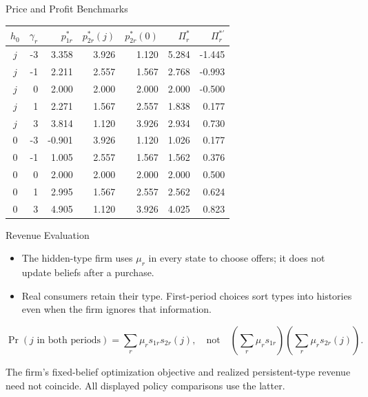 \gdef\shortbuttons{\hyperlink{short-14}{\beamergotobutton{Back}}}
\begin{frame}[label=short-13,noframenumbering]{Price and Profit Benchmarks}
  \begin{center}\small\begin{tabular}{crrrrrr}\toprule
  $h_0$ & $\gamma_r$ & $p_{1r}^*$ & $p_{2r}^*(j)$ & $p_{2r}^*(0)$ & $\Pi_r^*$ & $\Pi_r^{*\prime}$\\\midrule
  $j$ & -3 & 3.358 & 3.926 & 1.120 & 5.284 & -1.445\\
  $j$ & -1 & 2.211 & 2.557 & 1.567 & 2.768 & -0.993\\
  $j$ & 0 & 2.000 & 2.000 & 2.000 & 2.000 & -0.500\\
  $j$ & 1 & 2.271 & 1.567 & 2.557 & 1.838 & 0.177\\
  $j$ & 3 & 3.814 & 1.120 & 3.926 & 2.934 & 0.730\\
  $0$ & -3 & -0.901 & 3.926 & 1.120 & 1.026 & 0.177\\
  $0$ & -1 & 1.005 & 2.557 & 1.567 & 1.562 & 0.376\\
  $0$ & 0 & 2.000 & 2.000 & 2.000 & 2.000 & 0.500\\
  $0$ & 1 & 2.995 & 1.567 & 2.557 & 2.562 & 0.624\\
  $0$ & 3 & 4.905 & 1.120 & 3.926 & 4.025 & 0.823\\
  \bottomrule\end{tabular}\end{center}
\end{frame}



\gdef\shortbuttons{\hyperlink{short-20}{\beamergotobutton{Back}}}
\begin{frame}[label=short-54,noframenumbering]{Revenue Evaluation}
  \begin{itemize}
    \item The hidden-type firm uses $\mu_r$ in every state to choose offers;
    it does not update beliefs after a purchase.
    \item Real consumers retain their type. First-period choices sort types into
    histories even when the firm ignores that information.
  \end{itemize}
  \[
    \Pr(j\text{ in both periods})=\sum_r\mu_r s_{1r}s_{2r}(j),
    \quad\text{not}\quad
    \left(\sum_r\mu_r s_{1r}\right)\left(\sum_r\mu_r s_{2r}(j)\right).
  \]
  \begin{tcolorbox}
    The firm's fixed-belief optimization objective and realized persistent-type
    revenue need not coincide. All displayed policy comparisons use the latter.
  \end{tcolorbox}
\end{frame}



